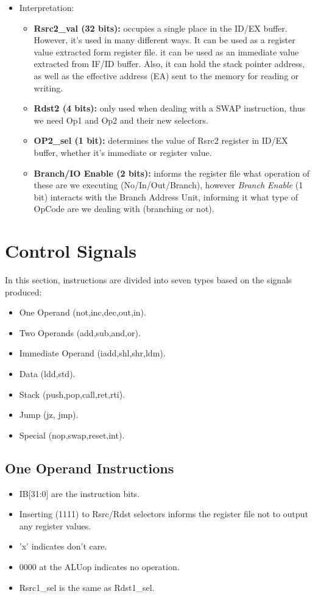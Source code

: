 \begin{itemize}
\begin{itemize}
    \end{itemize}
    
    \item Interpretation:
    \begin{itemize}
        \item \textbf{Rsrc2\_val (32 bits):} occupies a single place in the ID/EX buffer. However, it's used in many different ways. It can be used as a register value extracted form register file. it can be used as an immediate value extracted from IF/ID buffer. Also, it can hold the stack pointer address, as well as the effective address (EA) sent to the memory for reading or writing.
        \item \textbf{Rdst2 (4 bits):} only used when dealing with a SWAP instruction, thus we need Op1 and Op2 and their new selectors.
        \item \textbf{OP2\_sel (1 bit):} determines the value of Rsrc2 register in ID/EX buffer, whether it's immediate or register value.
        \item  \textbf{Branch/IO Enable (2 bits):} informs the register file what operation of these are we executing (No/In/Out/Branch), however \emph{Branch Enable} (1 bit) interacts with the Branch Address Unit, informing it what type of OpCode are we dealing with (branching or not).
    \end{itemize}
\end{itemize}

\section{Control Signals}
In this section, instructions are divided into seven types based on the signals produced:
\begin{itemize}
    \item One Operand (not,inc,dec,out,in).
    \item Two Operands (add,sub,and,or).
    \item Immediate Operand (iadd,shl,shr,ldm).
    \item Data (ldd,std).
    \item Stack (push,pop,call,ret,rti).
    \item Jump (jz, jmp).
    \item Special (nop,swap,reset,int).
\end{itemize}   

\subsection{One Operand Instructions}
\begin{itemize}
    \item IB[31:0] are the instruction bits.
    \item Inserting (1111) to Rsrc/Rdst selectors informs the register file not to output any register values.
    \item 'x' indicates don't care.
    \item 0000 at the ALUop indicates no operation.
    \item Rsrc1\_sel is the same as Rdst1\_sel.
\end{itemize}

